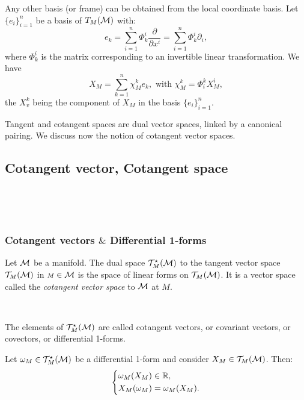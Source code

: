  \begin{remark}
 Any other basis (or frame) can be obtained from the local coordinate basis. Let $\{e_{i}\}_{i=1}^{n}$ be a basis of $T_{\scriptstyle M}( \mathcal{M})$ with: 
  \[
  e_{k}= \sum_{i=1}^n \Phi_{k}^{i}\frac{\partial}{\partial x^i}= \sum_{i=1}^n\Phi_{k}^{i} \partial_{i},
  \]
 where $\Phi_{k}^{i}$ is the matrix corresponding to an invertible linear transformation. 
 We have
  \[X_{\scriptstyle M}= \sum_{k=1}^{n}\chi^{k}_{\scriptstyle M} e_{k}, \text{ with } \chi^{k}_{\scriptstyle M}=\Phi^{k}_{i}X^{i}_{\scriptstyle M}, \]
 the $X^{k}_v$ being the component of $X_{\scriptstyle M}$ in the basis $\{e_{i}\}_{i=1}^{n}$.
 \end{remark}

Tangent and cotangent spaces are dual vector spaces, linked by a canonical pairing. We discuss now the notion of cotangent vector spaces. 
\,

 
\subsection{Cotangent vector, Cotangent space}
\ 

\,
\subsubsection{\bf Cotangent vectors $\&$ Differential 1-forms}
\begin{definition}
Let  $\mathcal{M}$ be a manifold. The dual space $\mathcal{T}^\star_{\scriptstyle M}(\mathcal{M})$ to the tangent
vector space $\mathcal{T}_{\scriptstyle M}(\mathcal{M})$ in ${\scriptstyle M}\in \mathcal{M}$  is the space of linear forms on  $\mathcal{T}_{\scriptstyle M}(\mathcal{M})$. It is a vector
space  called the \emph{cotangent vector space} to  $\mathcal{M}$ at ${\scriptstyle M}$. 

\, 

The elements of
$\mathcal{T}^\star_{\scriptstyle M}(\mathcal{M})$ are called cotangent vectors, or covariant vectors, or covectors, or differential 1-forms. 
\end{definition}


\noindent
Let $\omega_{\scriptstyle M} \in \mathcal{T}^\star_{\scriptstyle M}(\mathcal{M})$ be a differential 1-form and consider $X_{\scriptstyle M} \in \mathcal{T}_{\scriptstyle M}(\mathcal{M})$. Then:
\begin{equation}
\left\{ \begin{aligned} &\omega_{\scriptstyle M}(X_{\scriptstyle M} ) \in \mathbb{R},\\ 
 &X_{\scriptstyle M}(\omega_{\scriptstyle M})= \omega_{\scriptstyle M}(X_{\scriptstyle M}).
\end{aligned}\right. 
\end{equation}


